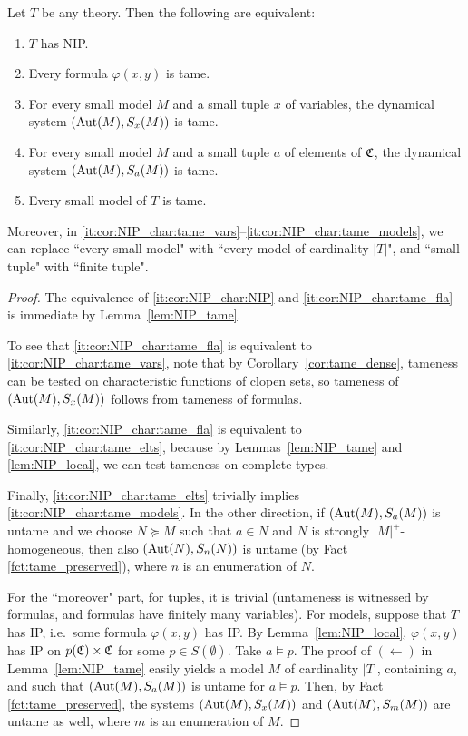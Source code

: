 	\begin{cor}
		\label{cor:NIP_char}
		Let $T$ be any theory. Then the following are equivalent:
		\begin{enumerate}
			\item
			\label{it:cor:NIP_char:NIP}
			$T$ has NIP.
			\item
			\label{it:cor:NIP_char:tame_fla}
			Every formula $\varphi(x,y)$ is tame.
			\item
			\label{it:cor:NIP_char:tame_vars}
			For every small model $M$ and a small tuple $x$ of variables, the dynamical system $(\operatorname{{Aut}}(M),S_{x}(M))$ is tame.
			\item
			\label{it:cor:NIP_char:tame_elts}
			For every small model $M$ and a small tuple $a$ of elements of ${\mathfrak C}$, the dynamical system $(\operatorname{{Aut}}(M),S_{a}(M))$ is tame.
			\item
			\label{it:cor:NIP_char:tame_models}
			Every small model of $T$ is tame.
		\end{enumerate}
		Moreover, in \ref{it:cor:NIP_char:tame_vars}--\ref{it:cor:NIP_char:tame_models}, we can replace ``every small model" with ``every model of cardinality $\lvert T\rvert$", and ``small tuple" with ``finite tuple".
	\end{cor}
	\begin{proof}
		The equivalence of \ref{it:cor:NIP_char:NIP} and \ref{it:cor:NIP_char:tame_fla} is immediate by Lemma~\ref{lem:NIP_tame}.
		
		To see that \ref{it:cor:NIP_char:tame_fla} is equivalent to \ref{it:cor:NIP_char:tame_vars}, note that by Corollary~\ref{cor:tame_dense}, tameness can be tested on characteristic functions of clopen sets, so tameness of $(\operatorname{{Aut}}(M),S_{x}(M))$ follows from tameness of formulas.
		
		Similarly, \ref{it:cor:NIP_char:tame_fla} is equivalent to \ref{it:cor:NIP_char:tame_elts}, because by Lemmas~\ref{lem:NIP_tame} and \ref{lem:NIP_local}, we can test tameness on complete types.
		
		Finally, \ref{it:cor:NIP_char:tame_elts} trivially implies \ref{it:cor:NIP_char:tame_models}.
		In the other direction, if $(\operatorname{{Aut}}(M),S_a(M))$ is untame and we choose $N\succeq M$ such that $a\in N$ and $N$ is strongly $\lvert M\rvert^+$-homogeneous, then also $(\operatorname{{Aut}}(N),S_n(N))$ is untame (by Fact \ref{fct:tame_preserved}), where $n$ is an enumeration of $N$.
		
		For the ``moreover" part, for tuples, it is trivial (untameness is witnessed by formulas, and formulas have finitely many variables).
		For models, suppose that $T$ has IP, i.e.\ some formula $\varphi(x,y)$ has IP. By Lemma~\ref{lem:NIP_local}, $\varphi(x,y)$ has IP on $p({\mathfrak C}) \times {\mathfrak C}$ for some $p \in S(\emptyset)$. Take $a \models p$. The proof of $(\leftarrow)$ in Lemma~\ref{lem:NIP_tame} easily yields a model $M$ of cardinality $|T|$, containing $a$, and such that $(\operatorname{{Aut}}(M),S_a(M))$ is untame for $a \models p$. Then, by Fact \ref{fct:tame_preserved}, the systems $(\operatorname{{Aut}}(M),S_x(M))$ and $(\operatorname{{Aut}}(M),S_m(M))$ are untame as well, where $m$ is an enumeration of $M$.
	\end{proof}
	
